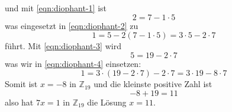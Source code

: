 \documentclass{report}
\begin{document}
und mit \ref{eqn:diophant-1} ist
\begin{equation}2 = 7 - 1 \cdot 5\end{equation}
was eingesetzt in \ref{eqn:diophant-2} zu
\begin{equation}1 = 5 -2(7 - 1 \cdot 5) = 3 \cdot 5 - 2 \cdot 7 \label{eqn:diophant-4}\end{equation}
führt. Mit \ref{eqn:diophant-3} wird
\begin{equation}5 = 19 - 2 \cdot 7\end{equation}
was wir in \ref{eqn:diophant-4} einsetzen:
\begin{equation}1 = 3 \cdot (19 - 2 \cdot 7) - 2 \cdot 7 = 3 \cdot 19 - 8 \cdot 7\end{equation}
Somit ist $x = -8$ in $\mathbb{Z}_{19}$ und die kleinste positive Zahl ist
\begin{equation}-8 + 19 = 11\end{equation}
also hat $7x = 1$ in $\mathbb{Z}_{19}$ die Lösung $x = 11$.
\end{document}
